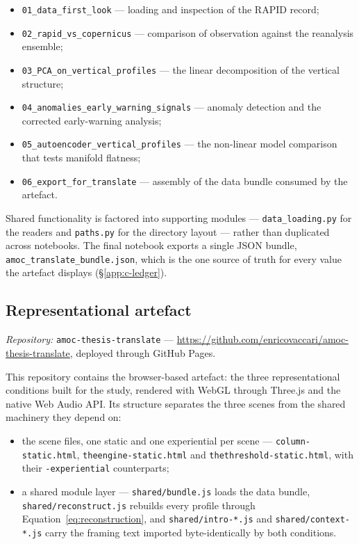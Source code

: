 \begin{itemize}
    \item \texttt{01\_data\_first\_look} --- loading and inspection of the RAPID record;
    \item \texttt{02\_rapid\_vs\_copernicus} --- comparison of observation against the
          reanalysis ensemble;
    \item \texttt{03\_PCA\_on\_vertical\_profiles} --- the linear decomposition of the
          vertical structure;
    \item \texttt{04\_anomalies\_early\_warning\_signals} --- anomaly detection and the
          corrected early-warning analysis;
    \item \texttt{05\_autoencoder\_vertical\_profiles} --- the non-linear model comparison
          that tests manifold flatness;
    \item \texttt{06\_export\_for\_translate} --- assembly of the data bundle consumed by the
          artefact.
\end{itemize}

\noindent Shared functionality is factored into supporting modules --- \texttt{data\_loading.py}
for the readers and \texttt{paths.py} for the directory layout --- rather than duplicated
across notebooks. The final notebook exports a single JSON bundle,
\texttt{amoc\_translate\_bundle.json}, which is the one source of truth for every value the
artefact displays (\S\ref{app:c-ledger}).

\subsection*{Representational artefact}
\textit{Repository:} \texttt{amoc-thesis-translate} ---
\url{https://github.com/enricovaccari/amoc-thesis-translate}, deployed through GitHub Pages.

This repository contains the browser-based artefact: the three representational conditions
built for the study, rendered with WebGL through Three.js and the native Web Audio API. Its
structure separates the three scenes from the shared machinery they depend on:

\begin{itemize}
    \item the scene files, one static and one experiential per scene ---
          \texttt{column-static.html}, \texttt{theengine-static.html} and
          \texttt{thethreshold-static.html}, with their \texttt{-experiential} counterparts;
    \item a shared module layer --- \texttt{shared/bundle.js} loads the data bundle,
          \texttt{shared/reconstruct.js} rebuilds every profile through
          Equation~\ref{eq:reconstruction}, and \texttt{shared/intro-*.js} and
          \texttt{shared/context-*.js} carry the framing text imported byte-identically by
          both conditions.
\end{itemize}

